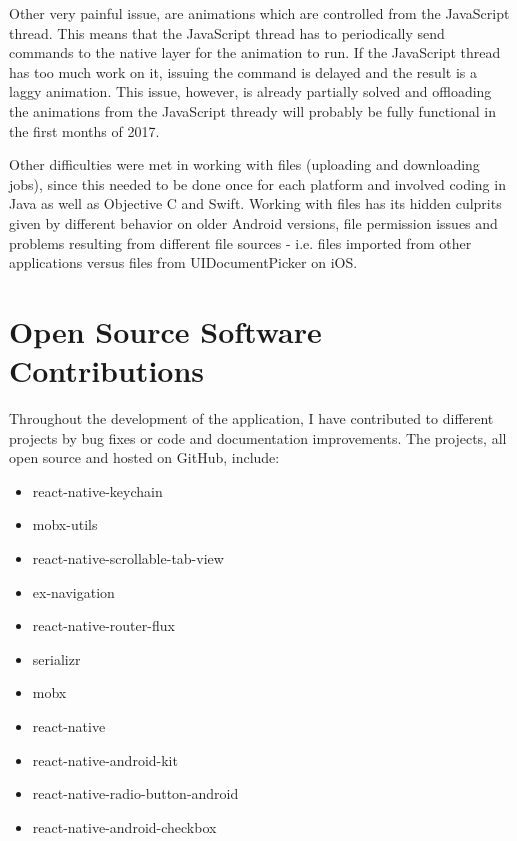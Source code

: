 Other very painful issue, are animations which are controlled from the JavaScript thread. This means that the JavaScript thread has to periodically send commands to the native layer for the animation to run. If the JavaScript thread has too much work on it, issuing the command is delayed and the result is a laggy animation. This issue, however, is already partially solved and offloading the animations from the JavaScript thready will probably be fully functional in the first months of 2017.

Other difficulties were met in working with files (uploading and downloading jobs), since this needed to be done once for each platform and involved coding in Java as well as Objective C and Swift. Working with files has its hidden culprits given by different behavior on older Android versions, file permission issues and problems resulting from different file sources - i.e. files imported from other applications versus files from UIDocumentPicker on iOS.


\section{Open Source Software Contributions}

Throughout the development of the application, I have contributed to different projects by bug fixes or code and documentation improvements. The projects, all open source and hosted on GitHub, include: 


\begin{itemize}
\item react-native-keychain
\item mobx-utils
\item react-native-scrollable-tab-view
\item ex-navigation
\item react-native-router-flux
\item serializr
\item mobx
\item react-native
\item react-native-android-kit
\item react-native-radio-button-android
\item react-native-android-checkbox
\end{itemize}


